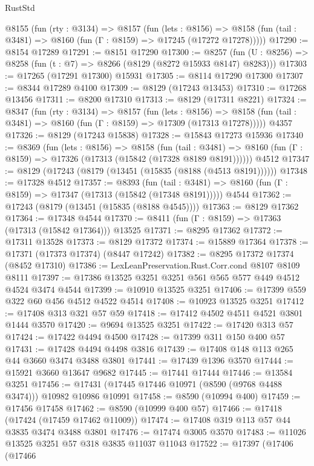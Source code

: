 \begin{lexlean}{RustStd}
\begin{coremodule}
  @8155
    (fun (rty : @3134) =>
    @8157
      (fun (lets : @8156) =>
      @8158 (fun (tail : @3481) => @8160 (fun (Γ : @8159) => @17245 (@17272 @17278)))))
@17290 := @8154 @17289
@17291 := @8151 @17290
@17300 := @8257
    (fun (U : @8256) => @8258 (fun (t : @7) => @8266 (@8129 (@8272 @15933 @8147) @8283)))
@17303 := @17265 (@17291 @17300) @15931
@17305 := @8114 @17290 @17300
@17307 := @8344 @17289 @4100
@17309 := @8129 (@17243 @13453)
@17310 := @17268 @13456
@17311 := @8200 @17310
@17313 := @8129 (@17311 @8221)
@17324 := @8347
    (fun (rty : @3134) =>
    @8157
      (fun (lets : @8156) =>
      @8158 (fun (tail : @3481) => @8160 (fun (Γ : @8159) => @17309 (@17313 @17278)))))
    @4357
@17326 := @8129 (@17243 @15838)
@17328 := @15843 @17273 @15936
@17340 := @8369
    (fun (lets : @8156) =>
    @8158
      (fun (tail : @3481) =>
      @8160 (fun (Γ : @8159) => @17326 (@17313 (@15842 (@17328 @8189 @8191))))))
    @4512
@17347 := @8129 (@17243 (@8179 (@13451 (@15835 (@8188 (@4513 @8191))))))
@17348 := @17328 @4512
@17357 := @8393
    (fun (tail : @3481) => @8160 (fun (Γ : @8159) => @17347 (@17313 (@15842 (@17348 @8191)))))
    @4544
@17362 := @17243 (@8179 (@13451 (@15835 (@8188 @4545))))
@17363 := @8129 @17362
@17364 := @17348 @4544
@17370 := @8411 (fun (Γ : @8159) => @17363 (@17313 (@15842 @17364))) @13525
@17371 := @8295 @17362
@17372 := @17311 @13528
@17373 := @8129 @17372
@17374 := @15889 @17364
@17378 := @17371 (@17373 @17374) (@8447 @17242)
@17382 := @8295 @17372 @17374 (@8452 @17310)
@17386 := LexLeanPreservation.Rust.Corr.cond @8107 @8109 @8111
@17397 := @17386 @13525 @3251 @3251 @561 @565 @577 @449 @4512 @4524 @3474 @4544
@17399 := @10910 @13525 @3251
@17406 := @17399 @559 @322 @60 @456 @4512 @4522 @4514
@17408 := @10923 @13525 @3251
@17412 := @17408 @313 @321 @57 @59
@17418 := @17412 @4502 @4511 @4521 @3801 @1444 @3570
@17420 := @9694 @13525 @3251
@17422 := @17420 @313 @57
@17424 := @17422 @4494 @4500
@17428 := @17399 @311 @150 @400 @57
@17431 := @17428 @4494 @4498 @3816
@17439 := @17408 @148 @113 @265 @44 @3660 @3474 @3488 @3801
@17441 := @17439 @1396 @3570
@17444 := @15921 @3660 @13647 @9682
@17445 := @17441 @17444
@17446 := @13584 @3251
@17456 := @17431 (@17445 @17446 @10971 (@8590 (@9768 @4488 @3474))) @10982 @10986 @10991
@17458 := @8590 (@10994 @400)
@17459 := @17456 @17458
@17462 := @8590 (@10999 @400 @57)
@17466 := @17418 (@17424 (@17459 @17462 @11009))
@17474 := @17408 @319 @113 @57 @44 @3835 @3474 @3488 @3801
@17476 := @17474 @3005 @3570
@17483 := @11026 @13525 @3251 @57 @318 @3835 @11037 @11043
@17522 := @17397
    (@17406
      (@17466

\end{coremodule}
\end{lexlean}
